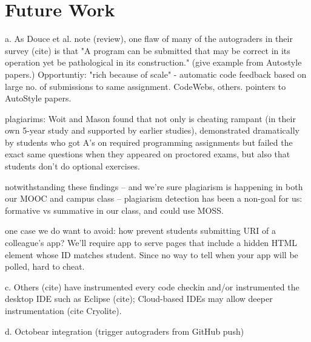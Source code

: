 \section{Future Work}



a.	As Douce et al. note (review), one flaw of many of the autograders in their survey (cite) is that "A program can be submitted that may be correct in its operation yet be pathological in its construction." (give example from Autostyle papers.) Opportuntiy: "rich because of scale" - automatic code feedback based on large no. of submissions to same assignment.  CodeWebs, others. pointers to AutoStyle papers.

plagiarims:
Woit and Mason found that not only is cheating rampant (in their
own 5-year study and supported by earlier studies), demonstrated
dramatically by students who got A's on required programming assignments
but failed the exact same questions when they appeared on proctored
exams, but  also that students don't do optional exercises.

notwithstanding these findings -- and we're sure plagiarism is happening
in both our MOOC and campus class -- plagiarism detection has been a
non-goal for us:  formative vs summative in our class, and could use MOSS.

one case we do want to avoid: how prevent students submitting URI of a colleague's app?
We'll require app to serve pages that include a hidden HTML element
whose ID matches student.  Since no way to tell when your app will be
polled, hard to cheat.


c.	Others (cite) have instrumented every code checkin and/or instrumented the desktop IDE  such as Eclipse (cite); Cloud-based IDEs may allow deeper instrumentation (cite Cryolite).

d.	Octobear integration (trigger autograders from GitHub push)



